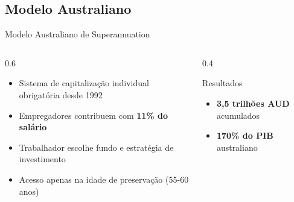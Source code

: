 \documentclass{libs/ufc_format}
\begin{document}
\subsection{Modelo Australiano}
\begin{frame}{Modelo Australiano de Superannuation}
    \begin{columns}
        \begin{column}{0.6\textwidth}
            \begin{itemize}
                \item Sistema de capitalização individual obrigatória desde 1992
                \item Empregadores contribuem com \textbf{11\% do salário}
                \item Trabalhador escolhe fundo e estratégia de investimento
                \item Acesso apenas na idade de preservação (55-60 anos)
            \end{itemize}
        \end{column}
        \begin{column}{0.4\textwidth}
            \begin{exampleblock}{Resultados}
                \begin{itemize}
                    \item \textbf{3,5 trilhões AUD} acumulados
                    \item \textbf{170\% do PIB} australiano
                \end{itemize}
            \end{exampleblock}
        \end{column}
    \end{columns}
    
    \vspace{0.3cm}
    
\end{frame}
\end{document}
